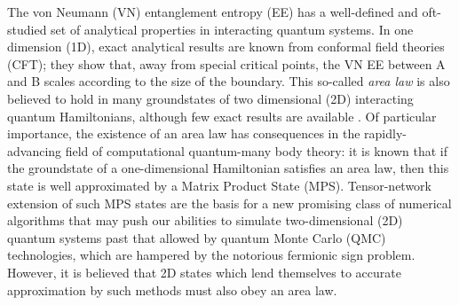 \documentclass[prl,aps,twocolumn,floatfix,amsmath,amssymb,superscriptaddress,tightenlines]{revtex4}
\begin{document}
The von Neumann (VN) entanglement entropy (EE) has a well-defined and oft-studied set of analytical properties in interacting quantum systems.  In one dimension (1D), exact analytical results are known from conformal field theories (CFT); they show that, away from special critical points, the VN EE between A and B scales according to the size of the boundary.  This so-called {\it area law} is also believed to hold in many groundstates of two dimensional (2D) interacting quantum Hamiltonians, although few exact results are available \cite{ALreview}.  
Of particular importance, the existence of an area law has consequences in the rapidly-advancing field of computational quantum-many body theory: it is known that if the groundstate of a one-dimensional Hamiltonian satisfies an area law, then this state is well approximated by a Matrix Product State (MPS).  Tensor-network extension of such MPS states are the basis for a new promising class of numerical algorithms that may push our abilities to simulate two-dimensional (2D) quantum systems past that allowed by quantum Monte Carlo (QMC) technologies, which are hampered by the notorious fermionic sign problem.  However, it is believed that 2D states which lend themselves to accurate approximation by such methods must also obey an area law.

\end{document}

